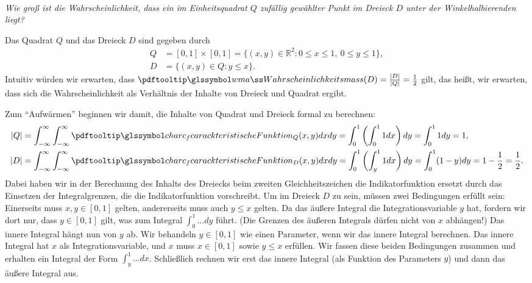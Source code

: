 \begin{bsp}
      \\
    \emph{Wie groß ist die Wahrscheinlichkeit, dass ein im Einheitsquadrat $Q$ zufällig gewählter
    Punkt im Dreieck $D$ unter der Winkelhalbierenden liegt?}

    Das Quadrat $Q$ und das Dreieck $D$ sind gegeben durch
    \begin{align*}
        Q &= [0,1] \times [0,1] = \{(x,y) \in \mathbb{R}^2 \colon 0 \leq x \leq 1,\ 0 \leq y \leq 1\},\\
        D &= \{(x,y) \in Q \colon y \leq x\}.
    \end{align*}
    Intuitiv würden wir erwarten, dass $\pe(D) = \frac{|D|}{|Q|} = \frac12$ gilt, das heißt, wir
    erwarten, dass sich die Wahrscheinlichkeit als Verhältnis der Inhalte von Dreieck und Quadrat
    ergibt.

    Zum ``Aufwärmen'' beginnen wir damit, die Inhalte von Quadrat und Dreieck formal zu
    berechnen:
    \begin{align*}
        |Q| &= \int_{-\infty}^{\infty} \int_{-\infty}^{\infty} \chaf_Q(x,y) dx dy
        = \int_{0}^{1} \left( \int_{0}^{1} 1 dx \right) dy = \int_{0}^{1} 1 dy = 1 ,\\
        |D| &= \int_{-\infty}^{\infty} \int_{-\infty}^{\infty} \chaf_D(x,y) dx dy
        = \int_{0}^{1} \left( \int_{y}^{1} 1 dx \right) dy
        = \int_{0}^{1} (1-y) dy = 1 - \frac12 = \frac12.
    \end{align*}
    Dabei haben wir in der Berechnung des Inhalts des Dreiecks beim zweiten Gleichheitszeichen die
    Indikatorfunktion ersetzt durch das Einsetzen der Integralgrenzen, die die Indikatorfunktion
    vorschreibt.
    Um im Dreieck $D$ zu sein, müssen zwei Bedingungen erfüllt sein: Einerseits muss
    $x,y \in [0,1]$ gelten, andererseits muss auch $y \leq x$ gelten.
    Da das äußere Integral die
    Integrationsvariable $y$ hat, fordern wir dort nur, dass $y \in [0,1]$ gilt, was zum Integral
    $\int_0^1 \dots dy$ führt.
    (Die Grenzen des äußeren Integrals dürfen nicht von $x$ abhängen!)
    Das innere Integral hängt nun von $y$ ab.
    Wir behandeln $y \in [0,1]$ wie einen Parameter, wenn
    wir das innere Integral berechnen.
    Das innere Integral hat $x$ als Integrationsvariable, und $x$
    muss $x \in [0,1]$ sowie $y \leq x$ erfüllen.
    Wir fassen diese beiden Bedingungen zusammen
    und erhalten ein Integral der Form $\int_y^1 \dots dx$.
    Schließlich rechnen wir erst das
    innere Integral (als Funktion des Parameters $y$) und dann das äußere Integral aus.


\end{bsp}

